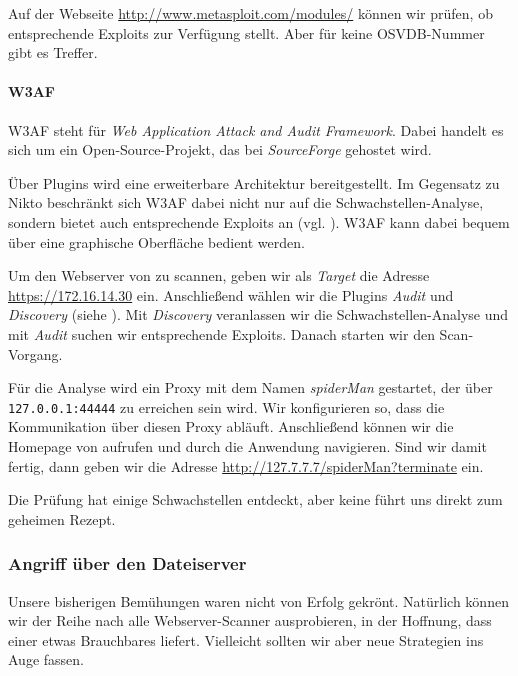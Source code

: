 
Auf der Webseite \url{http://www.metasploit.com/modules/} können wir prüfen, ob
\Metasploit{} entsprechende Exploits zur Verfügung stellt. Aber für keine
OSVDB-Nummer gibt es Treffer.
    
\paragraph{W3AF}

W3AF steht für \emph{Web Application Attack and Audit Framework}. Dabei handelt
es sich um ein Open-Source-Projekt, das bei \emph{SourceForge} gehostet wird.

Über Plugins wird eine erweiterbare Architektur bereitgestellt. Im Gegensatz zu
Nikto beschränkt sich W3AF dabei nicht nur auf die Schwachstellen-Analyse,
sondern bietet auch entsprechende Exploits an (vgl. \cite{W3AF}). W3AF kann
dabei bequem über eine graphische Oberfläche bedient werden.

Um den Webserver von \Mayerbrot{} zu scannen, geben wir als \emph{Target} die
Adresse \url{https://172.16.14.30} ein. Anschließend wählen wir die Plugins
\emph{Audit} und \emph{Discovery} (siehe ). Mit \emph{Discovery}
veranlassen wir die Schwachstellen-Analyse und mit \emph{Audit} suchen wir
entsprechende Exploits. Danach starten wir den Scan-Vorgang.


Für die Analyse wird ein Proxy mit dem Namen \emph{spiderMan} gestartet, der
über \texttt{127.0.0.1:44444} zu erreichen sein wird. Wir konfigurieren \Firefox{}
so, dass die Kommunikation über diesen Proxy abläuft. Anschließend können wir
die Homepage von \Mayerbrot{} aufrufen und durch die Anwendung
navigieren. Sind wir damit fertig, dann geben wir die Adresse
\url{http://127.7.7.7/spiderMan?terminate} ein.

Die Prüfung hat einige Schwachstellen entdeckt, aber keine führt uns direkt zum
geheimen Rezept.


\subsubsection{Angriff über den Dateiserver}

Unsere bisherigen Bemühungen waren nicht von Erfolg gekrönt. Natürlich können
wir der Reihe nach alle Webserver-Scanner ausprobieren, in der Hoffnung, dass
einer etwas Brauchbares liefert. Vielleicht sollten wir aber neue Strategien ins
Auge fassen.

